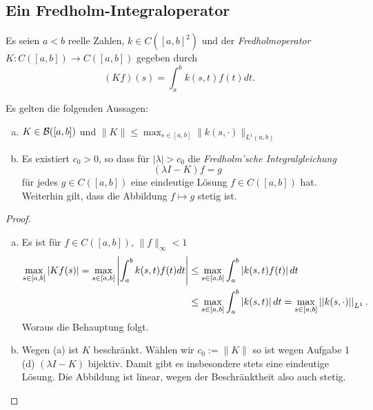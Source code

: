 \documentclass[FunkAnaskriptSS2017.tex]{subfiles}
\begin{document}
\subsection{Ein Fredholm-Integraloperator}
\label{B3.2}
	Es seien $a<b$ reelle Zahlen, $k\in C([a,b]^2)$ und der \textit{Fredholmoperator} $K:C([a,b]) \to C([a,b])$ gegeben durch 	
	$$ (Kf)(s) = \int^b_a k(s,t)f(t) dt.$$
	\begin{beh}
		Es gelten die folgenden Aussagen:
		\begin{enumerate}[(a)]
			\item $K\in \mathcal{B}([a,b])$ und $\| K \| \leq \max_{s\in[a,b]}\|k(s,\cdot) \|_{L^1(a,b)}$
			\item Es existiert $c_0 > 0$, so dass für $|\lambda| > c_0$ die \textit{Fredholm'sche Integralgleichung}
			$$(\lambda I - K)f = g$$
			für jedes $g \in C([a,b])$ eine eindeutige Lösung $f\in C([a,b])$ hat. Weiterhin gilt, dass die Abbildung $f\mapsto g$ stetig ist.
		\end{enumerate}
	\end{beh}
	\begin{proof}
		\begin{enumerate}[(a)]
		\item Es ist für $f \in C([a,b]),\, \|f\|_{\infty} < 1$
		\begin{equation*}
		\begin{split}
		\max_{s\in[a,b]} \left\lvert Kf(s) \right\rvert =  \max_{s\in[a,b]} \left\lvert \int^b_a k(s,t)f(t)dt \right\rvert 
		& \leq \max_{s\in[a,b]} \int^b_a \left\lvert  k(s,t)f(t) \right\rvert dt 
		\\ & \leq \max_{s\in[a,b]} \int^b_a \left\lvert  k(s,t) \right\rvert dt = \max_{s\in[a,b]} \left\lvert \left\lvert k(s,\cdot) \right\rvert \right\rvert_{L^1}.
		\end{split}
		\end{equation*}
		Woraus die Behauptung folgt.		
		\item Wegen (a) ist $K$ beschränkt. Wählen wir $c_0 := \|K\|$ so ist wegen Aufgabe 1 (d) $(\lambda I - K)$ bijektiv. Damit gibt es insbesondere stets eine eindeutige Lösung. Die Abbildung ist linear, wegen der Beschränktheit also auch stetig. 		
		
		\end{enumerate}
	\end{proof}

\end{document}
